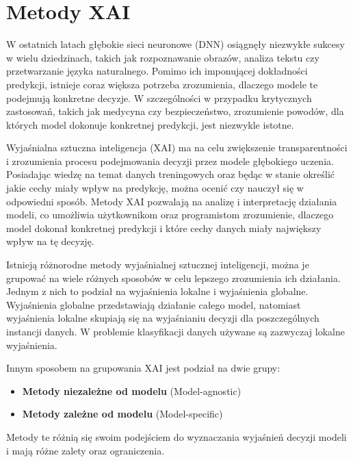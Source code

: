 
\section*{Metody XAI}
W ostatnich latach głębokie sieci neuronowe (DNN) osiągnęły niezwykłe sukcesy w wielu dziedzinach, takich jak rozpoznawanie obrazów, analiza tekstu czy przetwarzanie języka naturalnego.
Pomimo ich imponującej dokładności predykcji, istnieje coraz większa potrzeba zrozumienia, dlaczego modele te podejmują konkretne decyzje.
W szczególności w przypadku krytycznych zastosowań, takich jak medycyna\cite{medicalXAIexample, medicalXAIexampletret} czy bezpieczeństwo, zrozumienie powodów, dla których model dokonuje konkretnej predykcji, jest niezwykle istotne.

Wyjaśnialna sztuczna inteligencja (XAI)\cite{XAItax, XAIcurrent, XAIOnC, XAIcounter} ma na celu zwiększenie transparentności i zrozumienia procesu podejmowania decyzji przez modele głębokiego uczenia.
Posiadając wiedzę na temat danych treningowych oraz będąc w stanie określić jakie cechy miały wpływ na predykcję, można ocenić czy nauczył się w odpowiedni sposób.
Metody XAI pozwalają na analizę i interpretację działania modeli, co umożliwia użytkownikom oraz programistom zrozumienie, dlaczego model dokonał konkretnej predykcji i które cechy danych miały największy wpływ na tę decyzję.

Istnieją różnorodne metody wyjaśnialnej sztucznej inteligencji, można je grupować na wiele różnych sposobów w celu lepszego zrozumienia ich działania.
Jednym z nich to podział na wyjaśnienia lokalne\cite{ribeiro2016why} i wyjaśnienia globalne\cite{XAIglobal}.
Wyjaśnienia globalne przedstawiają działanie całego model, natomiast wyjaśnienia lokalne skupiają się na wyjaśnianiu decyzji dla poszczególnych instancji danych.
W problemie klasyfikacji danych używane są zazwyczaj lokalne wyjaśnienia.

Innym sposobem na grupowania XAI jest podział na dwie grupy:
\begin{itemize}
	\item \textbf{Metody niezależne od modelu} (Model-agnostic)
	\item \textbf{Metody zależne od modelu} (Model-specific)
\end{itemize}
Metody te różnią się swoim podejściem do wyznaczania wyjaśnień decyzji modeli i mają różne zalety oraz ograniczenia.

